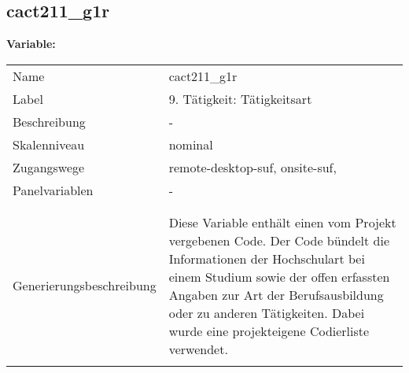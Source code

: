 	
	
	\subsection{cact211\_g1r}
	\label{subSection:cact211_g1r}

	\noindent\textbf{Variable:}\\
		\begin{tabular}{lL{11.3cm}}
			\label{tableVariable:cact211_g1r}
			Name & cact211\_g1r \\
			Label & 9. Tätigkeit: Tätigkeitsart \\
			Beschreibung & - \\
			Skalenniveau & nominal \\
			Zugangswege &
				remote-desktop-suf,
				onsite-suf,
 \\
			Panelvariablen & -
			 \\
			 \\
 \\
					Generierungsbeschreibung & Diese Variable enthält einen vom Projekt vergebenen Code. Der Code bündelt die  Informationen der Hochschulart bei einem Studium sowie der  offen erfassten Angaben zur Art der Berufsausbildung oder zu anderen Tätigkeiten. Dabei wurde eine projekteigene Codierliste verwendet.
				 \\	
			 \\
		\end{tabular}






